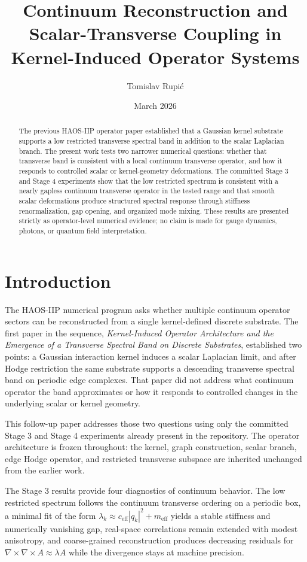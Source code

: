 \documentclass[11pt]{article}
\title{Continuum Reconstruction and Scalar-Transverse Coupling in Kernel-Induced Operator Systems}
\author{Tomislav Rupi\'c}
\date{March 2026}
\begin{document}
\maketitle

\begin{abstract}
The previous HAOS-IIP operator paper established that a Gaussian kernel substrate supports a low restricted transverse spectral band in addition to the scalar Laplacian branch. The present work tests two narrower numerical questions: whether that transverse band is consistent with a local continuum transverse operator, and how it responds to controlled scalar or kernel-geometry deformations. The committed Stage 3 and Stage 4 experiments show that the low restricted spectrum is consistent with a nearly gapless continuum transverse operator in the tested range and that smooth scalar deformations produce structured spectral response through stiffness renormalization, gap opening, and organized mode mixing. These results are presented strictly as operator-level numerical evidence; no claim is made for gauge dynamics, photons, or quantum field interpretation.
\end{abstract}

\section{Introduction}
The HAOS-IIP numerical program asks whether multiple continuum operator sectors can be reconstructed from a single kernel-defined discrete substrate. The first paper in the sequence, \emph{Kernel-Induced Operator Architecture and the Emergence of a Transverse Spectral Band on Discrete Substrates}, established two points: a Gaussian interaction kernel induces a scalar Laplacian limit, and after Hodge restriction the same substrate supports a descending transverse spectral band on periodic edge complexes. That paper did not address what continuum operator the band approximates or how it responds to controlled changes in the underlying scalar or kernel geometry.

This follow-up paper addresses those two questions using only the committed Stage 3 and Stage 4 experiments already present in the repository. The operator architecture is frozen throughout: the kernel, graph construction, scalar branch, edge Hodge operator, and restricted transverse subspace are inherited unchanged from the earlier work.

The Stage 3 results provide four diagnostics of continuum behavior. The low restricted spectrum follows the continuum transverse ordering on a periodic box, a minimal fit of the form $\lambda_k \approx c_{\mathrm{eff}} |q_k|^2 + m_{\mathrm{eff}}$ yields a stable stiffness and numerically vanishing gap, real-space correlations remain extended with modest anisotropy, and coarse-grained reconstruction produces decreasing residuals for $\nabla \times \nabla \times A \approx \lambda A$ while the divergence stays at machine precision.
\end{document}
